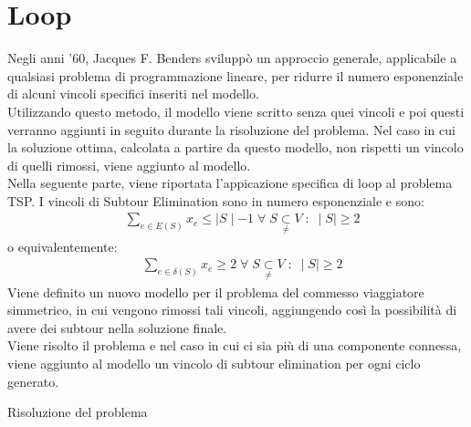 \section{Loop}
Negli anni '60, Jacques F. Benders sviluppò un approccio generale, applicabile a qualsiasi problema di programmazione lineare, per ridurre il numero esponenziale di alcuni vincoli specifici inseriti nel modello.\\
Utilizzando questo metodo, il modello viene scritto senza quei vincoli e poi questi verranno aggiunti in seguito durante la risoluzione del problema. Nel caso in cui la soluzione ottima, calcolata a partire da questo modello, non rispetti un vincolo di quelli rimossi, viene aggiunto al modello. \\
Nella seguente parte, viene riportata l'appicazione specifica di loop al problema TSP.
I vincoli di Subtour Elimination sono in numero esponenziale e sono:\\
\begin{align}
&\underset{e\in E(S)}\sum{x_{e}} \leq \mid S\mid - 1\;\forall\;S\underset{\neq}{\subset}V\; : \; \mid S\mid\geq 2
\end{align}
o equivalentemente:
\begin{align}
&\underset{e\in \delta(S)}\sum{x_{e}}\geq 2\;\forall\;S\underset{\neq}{\subset}V\; : \; \mid S\mid\geq 2
\end{align}
Viene definito un nuovo modello per il problema del commesso viaggiatore simmetrico, in cui vengono rimossi tali vincoli, aggiungendo così la possibilità di avere dei subtour nella soluzione finale.\\
Viene risolto il problema e nel caso in cui ci sia più di una componente connessa, viene aggiunto al modello un vincolo di subtour elimination per ogni ciclo generato.\\
\begin{algorithm}
\caption{Risoluzione del problema}
\begin{algorithmic}
\STATE {}
\STATE {}
\STATE {}
\ENDIF
\STATE {}
\ENDWHILE
\end{algorithmic}
\end{algorithm}
